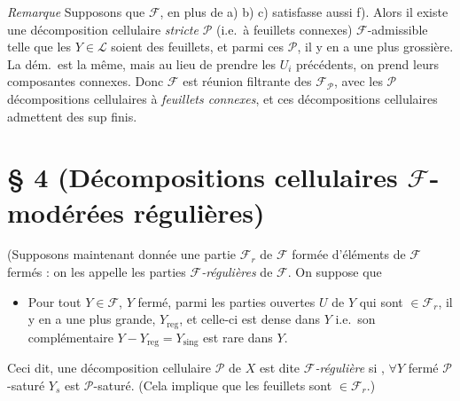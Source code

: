 \documentclass[11pt,a4paper]{article}
\begin{document}
\emph{Remarque} Supposons que $\mathcal{F}$, en plus de a) b) c) 
 satisfasse aussi f). Alors il existe une décomposition
cellulaire \emph{stricte} $\mathcal{P}$ (i.e.\ à feuillets connexes)
$\mathcal{F}$-admissible telle que les $Y \in \mathcal{L}$ soient des
 feuillets, et parmi ces $\mathcal{P}$, il y en a une plus
grossière. La dém.\ est la même, mais au lieu de prendre les $U_i$
précédents, on prend leurs composantes connexes. Donc $\mathcal{F}$ est
réunion filtrante des $\mathcal{F}_{\mathcal{P}}$, avec les $\mathcal{P}$
décompositions cellulaires à \emph{feuillets connexes}, et ces
décompositions cellulaires admettent des sup finis.

\section*{§ 4 (Décompositions cellulaires $\mathcal{F}$-modérées
régulières)}

(Supposons maintenant donnée une partie $\mathcal{F}_r$ de $\mathcal{F}$
formée d'éléments de $\mathcal{F}$  \struck{\ill{}} fermés : on
les appelle les parties \emph{$\mathcal{F}$-régulières} de $\mathcal{F}$. On
suppose que
\begin{itemize}
  \item[(S)] Pour tout $Y \in \mathcal{F}$, $Y$ \struck{\ill{}} fermé, parmi
  les parties  ouvertes $U$ de $Y$ qui sont $\in \mathcal{F}_r$, il
  y en a une plus grande, $Y_{\mathrm{reg}}$, et celle-ci est dense dans $Y$
  i.e.\ son complémentaire $Y - Y_{\mathrm{reg}} = Y_{\mathrm{sing}}$ est rare
  dans $Y$.
\end{itemize}

Ceci dit, une décomposition cellulaire $\mathcal{P}$ de $X$ est dite
\emph{$\mathcal{F}$-régulière} si 
  
 \struck{\ill{}} , \struck{\ill{}} $\forall Y$ fermé $\mathcal{P}$-saturé
$Y_s$ est $\mathcal{P}$-saturé. (Cela implique que les feuillets sont $\in
\mathcal{F}_r$.)
\end{document}
